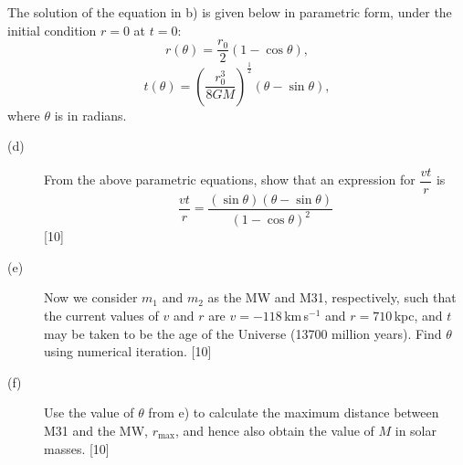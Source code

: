 The solution of the equation in b) is given below in parametric form, under
the initial condition $r = 0$ at $t = 0$:
\[ r(\theta) = \frac{r_0}{2}\left(1 - \cos\theta\right), \]
\[ t(\theta) = \left(\frac{r_0^3}{8GM}\right)^{\frac{1}{2}}
   \left(\theta - \sin\theta\right), \]
where $\theta$ is in radians.

\begin{description}
\item[(d)] From the above parametric equations, show that an expression for
  $\dfrac{vt}{r}$ is
  \[ \frac{vt}{r} = \frac{(\sin\theta)(\theta - \sin\theta)}
     {(1 - \cos\theta)^2} \]
  \hfill[10]
\item[(e)] Now we consider $m_1$ and $m_2$ as the MW and M31, respectively,
  such that the current values of $v$ and $r$ are $v = -118$\,km\,s$^{-1}$ and
  $r = 710$\,kpc, and $t$ may be taken to be the age of the Universe (13700
  million years). Find $\theta$ using numerical iteration. \hfill[10]
\item[(f)] Use the value of $\theta$ from e) to calculate the maximum distance
  between M31 and the MW, $r_{\max}$, and hence also obtain the value of $M$
  in solar masses. \hfill[10]
\end{description}
